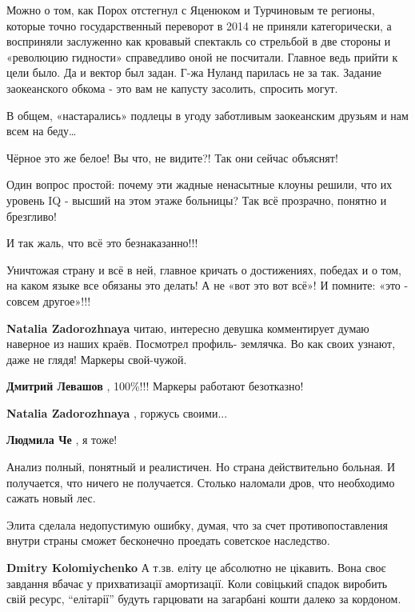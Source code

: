 \begin{itemize}
\begin{itemize}
Можно о том, как Порох отстегнул с Яценюком и Турчиновым те регионы, которые
точно государственный переворот в 2014 не приняли категорически, а восприняли
заслуженно как кровавый спектакль со стрельбой в две стороны и «революцию
гидности» справедливо оной не посчитали. Главное ведь прийти к цели было. Да и
вектор был задан. Г-жа Нуланд парилась не за так. Задание заокеанского обкома -
это вам не капусту засолить, спросить могут.

В общем, «настарались» подлецы в угоду заботливым заокеанским друзьям и нам
всем на беду…

Чёрное это же белое! Вы что, не видите?! Так они сейчас объяснят!

Один вопрос простой: почему эти жадные ненасытные клоуны решили, что их уровень
IQ - высший на этом этаже больницы? Так всё прозрачно, понятно и брезгливо!

И так жаль, что всё это безнаказанно!!!

Уничтожая страну и всё в ней, главное кричать о достижениях, победах и о том,
на каком языке все обязаны это делать! А не «вот это вот всё»! И помните: «это
- совсем другое»!!!


\textbf{Natalia Zadorozhnaya} читаю, интересно девушка комментирует думаю наверное из наших краёв. Посмотрел профиль- землячка. Во как своих узнают, даже не глядя! Маркеры свой-чужой.

\textbf{Дмитрий Левашов} , 100\%!!!
Маркеры работают безотказно!

\textbf{Natalia Zadorozhnaya} , горжусь своими...

\textbf{Людмила Че} , я тоже!
\end{itemize} %


Анализ полный, понятный и реалистичен. Но страна действительно больная. И
получается, что ничего не получается. Столько наломали дров, что необходимо
сажать новый лес.

\begin{itemize} %

Элита сделала недопустимую ошибку, думая, что за счет противопоставления внутри
страны сможет бесконечно проедать советское наследство.

\textbf{Dmitry Kolomiychenko} А т.зв. еліту це абсолютно не цікавить. Вона своє завдання вбачає у прихватизації амортизації. Коли совіцький спадок виробить свій ресурс, \enquote{елітарії} будуть гарцювати на загарбані кошти далеко за кордоном.
\end{itemize} %


\end{itemize}
